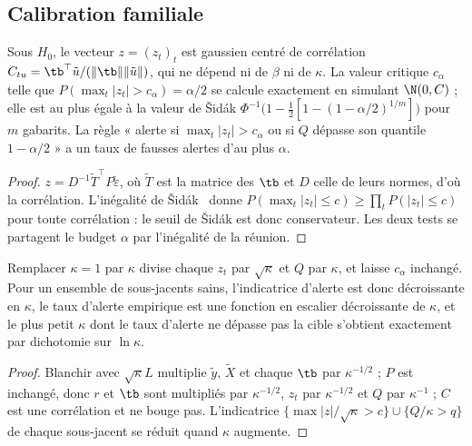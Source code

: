 \subsection{Calibration familiale}
\begin{proposition}\label{prop-family}
Sous $H_0$, le vecteur $z=(z_t)_t$ est gaussien centré de corrélation $C_{tu}=\tb^\top\tilde u/(\|\tb\|\|\tilde u\|)$, qui ne
dépend ni de $\beta$ ni de $\kappa$. La valeur critique $c_\alpha$ telle que $P(\max_t|z_t|>c_\alpha)=\alpha/2$ se calcule
exactement en simulant $\N(0,C)$ ; elle est au plus égale à la valeur de Šidák
$\Phi^{-1}\bigl(1-\tfrac12[1-(1-\alpha/2)^{1/m}]\bigr)$ pour $m$ gabarits. La règle « alerte si $\max_t|z_t|>c_\alpha$ ou si
$Q$ dépasse son quantile $1-\alpha/2$ » a un taux de fausses alertes d'au plus $\alpha$.
\end{proposition}
\begin{proof}
$z=D^{-1}\tilde T^\top P\tilde\varepsilon$, où $\tilde T$ est la matrice des $\tb$ et $D$ celle de leurs normes, d'où la
corrélation. L'inégalité de Šidák~\cite{sidak1967} donne $P(\max_t|z_t|\le c)\ge\prod_tP(|z_t|\le c)$ pour toute
corrélation : le seuil de Šidák est donc conservateur. Les deux tests se partagent le budget $\alpha$ par l'inégalité de
la réunion.
\end{proof}

\begin{proposition}\label{prop-kappa}
Remplacer $\kappa=1$ par $\kappa$ divise chaque $z_t$ par $\sqrt\kappa$ et $Q$ par $\kappa$, et laisse $c_\alpha$ inchangé.
Pour un ensemble de sous-jacents sains, l'indicatrice d'alerte est donc décroissante en $\kappa$, le taux d'alerte
empirique est une fonction en escalier décroissante de $\kappa$, et le plus petit $\kappa$ dont le taux d'alerte ne dépasse
pas la cible s'obtient exactement par dichotomie sur $\ln\kappa$.
\end{proposition}
\begin{proof}
Blanchir avec $\sqrt\kappa L$ multiplie $\tilde y$, $\tilde X$ et chaque $\tb$ par $\kappa^{-1/2}$ ; $P$ est inchangé, donc $r$ et
$\tb$ sont multipliés par $\kappa^{-1/2}$, $z_t$ par $\kappa^{-1/2}$ et $Q$ par $\kappa^{-1}$ ; $C$ est une corrélation et ne bouge
pas. L'indicatrice $\{\max|z|/\sqrt\kappa>c\}\cup\{Q/\kappa>q\}$ de chaque sous-jacent se réduit quand $\kappa$ augmente.
\end{proof}

